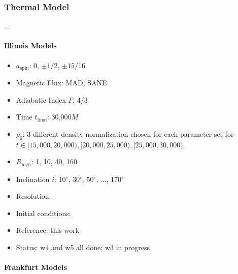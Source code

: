 \subsubsection{Thermal Model}

...

\paragraph{Illinois Models}

\begin{itemize}[noitemsep]
\item $a_\mathrm{spin}$: 0, $\pm1/2$, $\pm15/16$
\item Magnetic Flux: MAD, SANE
\item Adiabatic Index $\Gamma$: 4/3
\item Time $t_\mathrm{final}$: 30,000$M$
\item $\rho_0$: 3 different density normalization chosen for each parameter set for $t \in [15,000, 20,000), [20,000, 25,000), [25,000, 30,000)$.
\item $R_\mathrm{high}$: 1, 10, 40, 160
\item Inclination $i$: 10$^\circ$, 30$^\circ$, 50$^\circ$, ..., 170$^\circ$
\item Resolution:
\item Initial conditions:
\item Reference: this work
\item Status: w4 and w5 all done; w3 in progress
\end{itemize}

\paragraph{Frankfurt Models}

